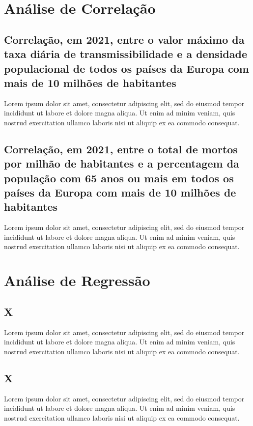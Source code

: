 \documentclass[conference]{IEEEtran}
\begin{document}
\section{Análise de Correlação} %

\subsection{Correlação, em 2021, entre o valor máximo da taxa diária de transmissibilidade e a densidade populacional de todos os países da Europa com mais de 10 milhões de habitantes}
Lorem ipsum dolor sit amet, consectetur adipiscing elit, sed do eiusmod tempor incididunt ut labore et dolore magna aliqua. Ut enim ad minim veniam, quis nostrud exercitation ullamco laboris nisi ut aliquip ex ea commodo consequat.

\subsection{Correlação, em 2021, entre o total de mortos por milhão de habitantes e a percentagem da população com 65 anos ou mais em todos os países da Europa com mais de 10 milhões de habitantes}
Lorem ipsum dolor sit amet, consectetur adipiscing elit, sed do eiusmod tempor incididunt ut labore et dolore magna aliqua. Ut enim ad minim veniam, quis nostrud exercitation ullamco laboris nisi ut aliquip ex ea commodo consequat.

\section{Análise de Regressão} %

\subsection{X}
Lorem ipsum dolor sit amet, consectetur adipiscing elit, sed do eiusmod tempor incididunt ut labore et dolore magna aliqua. Ut enim ad minim veniam, quis nostrud exercitation ullamco laboris nisi ut aliquip ex ea commodo consequat.

\subsection{X}
Lorem ipsum dolor sit amet, consectetur adipiscing elit, sed do eiusmod tempor incididunt ut labore et dolore magna aliqua. Ut enim ad minim veniam, quis nostrud exercitation ullamco laboris nisi ut aliquip ex ea commodo consequat.
\end{document}
